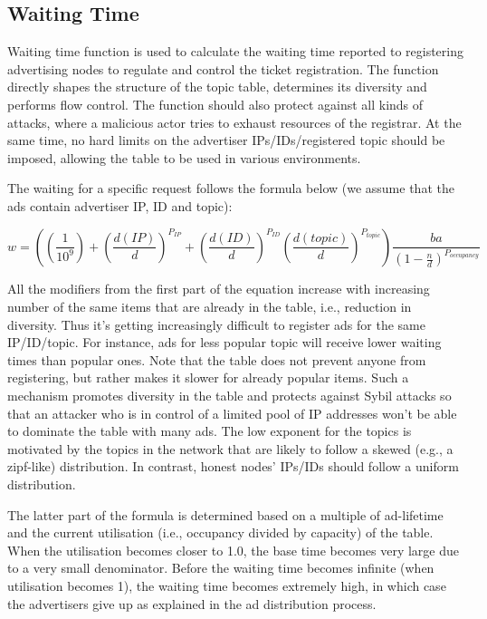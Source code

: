 \subsection{Waiting Time}
Waiting time function is used to calculate the waiting time reported to registering advertising nodes to regulate and control the ticket registration. The function directly shapes the structure of the topic table, determines its diversity and performs flow control. The function should also protect against all kinds of attacks, where a malicious actor tries to exhaust resources of the registrar. At the same time, no hard limits on the advertiser IPs/IDs/registered topic should be imposed, allowing the table to be used in various environments.

The waiting for a specific request follows the formula below (we assume that the ads contain advertiser IP, ID and topic):


\begin{equation}
    w=((\frac{1}{10^9}) + (\frac{d(IP)}{d})^{P_{IP}}+(\frac{d(ID)}{d})^{P_{ID}} (\frac{d(topic)}{d})^{P_{topic}}) \frac{ba}{(1-\frac{n}{d})^{P_{occupancy}}}
\end{equation}

All the modifiers from the first part of the equation increase with increasing number of the same items that are already in the table, i.e., reduction in diversity. Thus it's getting increasingly difficult to register ads for the same IP/ID/topic. For instance, ads for less popular topic will receive lower waiting times than popular ones. Note that the table does not prevent anyone from registering, but rather makes it slower for already popular items. Such a mechanism promotes diversity in the table and protects against Sybil attacks so that an attacker who is in control of a limited pool of IP addresses won't be able to dominate the table with many ads. The low exponent for the topics is motivated by the topics in the network that are likely to follow a skewed (e.g., a zipf-like) distribution. In contrast, honest nodes' IPs/IDs should follow a uniform distribution.

The latter part of the formula is determined based on a multiple of ad-lifetime and the current utilisation (i.e., occupancy divided by capacity) of the table. When the utilisation becomes closer to 1.0, the base time becomes very large due to a very small denominator. Before the waiting time becomes infinite (when utilisation becomes 1), the waiting time becomes extremely high, in which case the advertisers give up as explained in the ad distribution process.

